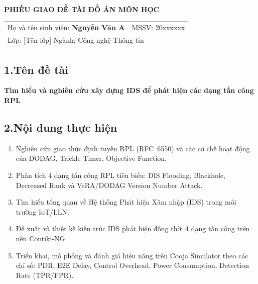 \thispagestyle{empty}
\begin{center}
  \textbf{\large PHIẾU GIAO ĐỀ TÀI ĐỒ ÁN MÔN HỌC}
\end{center}

\begin{table}[H]
  \centering
  \begin{tabular}{l r}
    \fontsize{13pt}{0pt}\selectfont Họ và tên sinh viên: \textbf{Nguyễn Văn A}
      & \fontsize{13pt}{0pt}\selectfont MSSV: 20xxxxxx \\[0.3cm]
    \multicolumn{2}{l}{\fontsize{13pt}{0pt}\selectfont
      Lớp: [Tên lớp] \hspace{2cm} Ngành: Công nghệ Thông tin} \\
  \end{tabular}
\end{table}

\subsection*{\textnormal{1.\quad Tên đề tài}}
\textbf{Tìm hiểu và nghiên cứu xây dựng IDS để phát hiện các dạng tấn công RPL}

\subsection*{\textnormal{2.\quad Nội dung thực hiện}}
\begin{enumerate}
  \item Nghiên cứu giao thức định tuyến RPL (RFC~6550) và các cơ chế hoạt động
        của DODAG, Trickle Timer, Objective Function.
  \item Phân tích 4 dạng tấn công RPL tiêu biểu: DIS Flooding, Blackhole,
        Decreased Rank và VeRA/DODAG Version Number Attack.
  \item Tìm hiểu tổng quan về Hệ thống Phát hiện Xâm nhập (IDS) trong môi
        trường IoT/LLN.
  \item Đề xuất và thiết kế kiến trúc IDS phát hiện đồng thời 4 dạng tấn công
        trên nền Contiki-NG.
  \item Triển khai, mô phỏng và đánh giá hiệu năng trên Cooja Simulator theo
        các chỉ số: PDR, E2E Delay, Control Overhead, Power Consumption,
        Detection Rate (TPR/FPR).
\end{enumerate}

